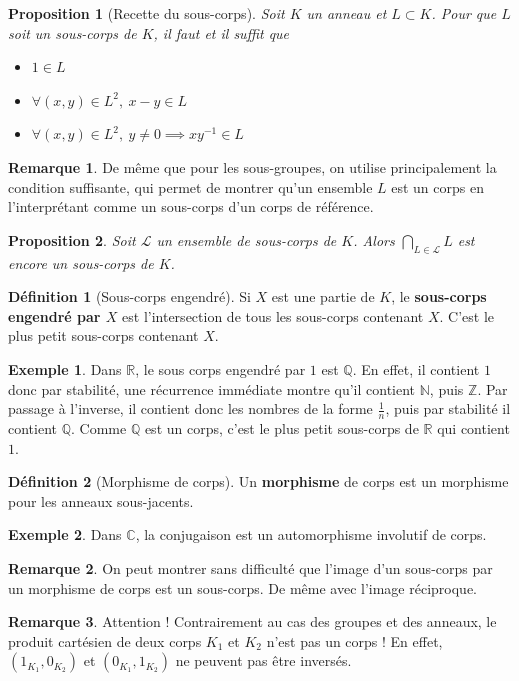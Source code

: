 \documentclass[french]{book}
\newcommand{\N}{\mathbb{N}}
\newcommand{\Z}{\mathbb{Z}}
\newcommand{\Q}{\mathbb{Q}}
\newcommand{\R}{\mathbb{R}}
\newcommand{\C}{\mathbb{C}}
\newcommand{\inv}{^{-1}}
\theoremstyle{plain}
\newtheorem{prop}{Proposition}[chapter]
\theoremstyle{definition}
\newtheorem{dfn}{Définition}[chapter]
\newtheorem{exa}{Exemple}[chapter]
\newtheorem{rmq}{Remarque}[chapter]
\theoremstyle{remark}
\begin{document}
\begin{prop}[Recette du sous-corps]
	Soit $K$ un anneau et $L\subset K$. Pour que $L$ soit un sous-corps de $K$, il faut et il suffit que \begin{itemize}
		\item $1\in L$
		\item $\forall(x,y)\in L^2,\ x-y\in L$
		\item $\forall(x,y)\in L^2,\ y\ne0\implies xy\inv\in L$
	\end{itemize}
\end{prop}
\begin{rmq}
	De même que pour les sous-groupes, on utilise principalement la condition suffisante, qui permet de montrer qu'un ensemble $L$ est un corps en l'interprétant comme un sous-corps d'un corps de référence.
\end{rmq}
\begin{prop}
	Soit $\mathcal{L}$ un ensemble de sous-corps de $K$. Alors $\displaystyle\bigcap_{L\in\mathcal{L}}L$ est encore un sous-corps de $K$.
\end{prop}
\begin{dfn}[Sous-corps engendré]
	Si $X$ est une partie de $K$, le \textbf{sous-corps engendré par $X$} est l'intersection de tous les sous-corps contenant $X$. C'est le plus petit sous-corps contenant $X$.
\end{dfn}
\begin{exa}
	Dans $\R$, le sous corps engendré par $1$ est $\Q$. En effet, il contient $1$ donc par stabilité, une récurrence immédiate montre qu'il contient $\N$, puis $\Z$. Par passage à l'inverse, il contient donc les nombres de la forme $\displaystyle\frac{1}{n}$, puis par stabilité il contient $\Q$. Comme $\Q$ est un corps, c'est le plus petit sous-corps de $\R$ qui contient $1$.
\end{exa}
\begin{dfn}[Morphisme de corps]
	Un \textbf{morphisme} de corps est un morphisme pour les anneaux sous-jacents.
\end{dfn}
\begin{exa}
	Dans $\C$, la conjugaison est un automorphisme involutif de corps.
\end{exa}
\begin{rmq}
	On peut montrer sans difficulté que l'image d'un sous-corps par un morphisme de corps est un sous-corps. De même avec l'image réciproque.
\end{rmq}
\begin{rmq}
	Attention ! Contrairement au cas des groupes et des anneaux, le produit cartésien de deux corps $K_1$ et $K_2$ n'est pas un corps ! En effet, $(1_{K_1},0_{K_2})$ et $(0_{K_1},1_{K_2})$ ne peuvent pas être inversés.
\end{rmq}
\end{document}
